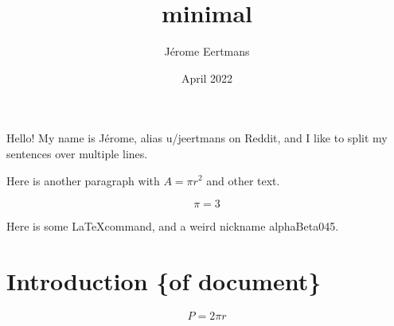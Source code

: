 \documentclass{article}
\title{minimal}
\author{Jérome Eertmans}
\date{April 2022}
\begin{document}
\maketitle %

Hello! My name is Jérome, alias u/jeertmans on Reddit, and I like to
split my sentences over multiple lines.

Here is another paragraph with $ A = \pi r^2 $ and other text.

$$ \pi = 3 $$

Here is some \LaTeX command, and a weird nickname alphaBeta045.

\section{Introduction \{of document\}}

    \begin{equation}
        P = 2 \pi r
    \end{equation}
\end{document}
